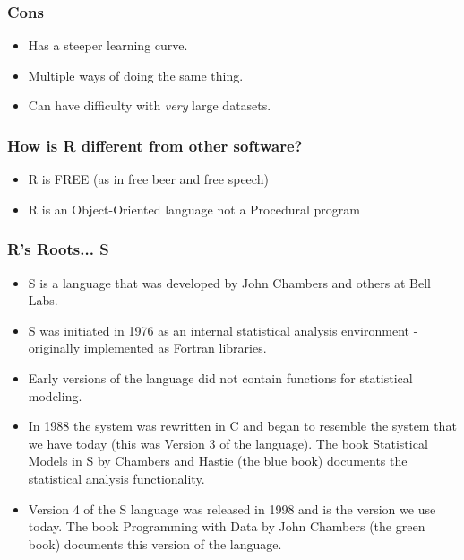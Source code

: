 \documentclass{beamer}\usepackage[]{graphicx}\usepackage[]{color}
\begin{document}
\begin{frame}
	\frametitle{Cons}
	\begin{itemize}
		\item<+-| alert@+> Has a steeper learning curve.
		\item<+-| alert@+> Multiple ways of doing the same thing.
		\item<+-| alert@+> Can have difficulty with \textit{very} large datasets.
	\end{itemize}
\end{frame}

\begin{frame}[fragile]
  \frametitle{How is R different from other software?}
  \begin{itemize}
    \item<+-| alert@+> {R is FREE (as in free beer and free speech)}
    \item<+-| alert@+> R is an Object-Oriented language not a Procedural program
  \end{itemize}  
\end{frame}

\begin{frame}[c]
	\frametitle{R's Roots... S}
	\begin{itemize}
	\item S is a language that was developed by John Chambers and others at Bell Labs.
	\item S was initiated in 1976 as an internal statistical analysis environment - originally implemented as Fortran libraries.
	\item Early versions of the language did not contain functions for statistical modeling.
	\item In 1988 the system was rewritten in C and began to resemble the system that we have today (this was Version 3 of the language). The book Statistical Models in S by Chambers and Hastie (the blue book) documents the statistical analysis functionality.
	\item Version 4 of the S language was released in 1998 and is the version we use today. The book Programming with Data by John Chambers (the green book) documents this version of the language.
	\end{itemize}
\end{frame}
\end{document}
